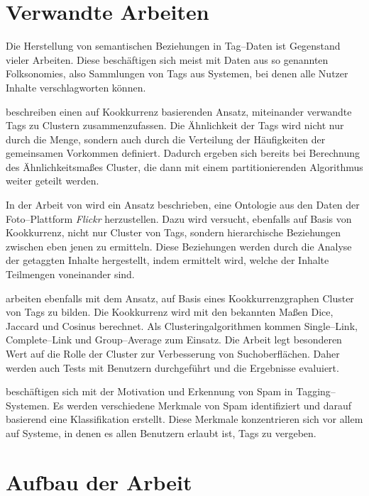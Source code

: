 \section{Verwandte Arbeiten}

Die Herstellung von semantischen Beziehungen in Tag--Daten ist Gegenstand vieler Arbeiten. Diese beschäftigen sich meist mit Daten aus so genannten Folksonomies, also Sammlungen von Tags aus Systemen, bei denen alle Nutzer Inhalte verschlagworten können.

\textcite{bks2006} beschreiben einen auf Kookkurrenz basierenden Ansatz, miteinander verwandte Tags zu Clustern zusammenzufassen. Die Ähnlichkeit der Tags wird nicht nur durch die Menge, sondern auch durch die Verteilung der Häufigkeiten der gemeinsamen Vorkommen definiert. Dadurch ergeben sich bereits bei Berechnung des Ähnlichkeitsmaßes Cluster, die dann mit einem partitionierenden Algorithmus weiter geteilt werden.

In der Arbeit von \textcite{ps2006} wird ein Ansatz beschrieben, eine Ontologie aus den Daten der Foto--Plattform \emph{Flickr} herzustellen. Dazu wird versucht, ebenfalls auf Basis von Kookkurrenz, nicht nur Cluster von Tags, sondern hierarchische Beziehungen zwischen eben jenen zu ermitteln. Diese Beziehungen werden durch die Analyse der getaggten Inhalte hergestellt, indem ermittelt wird, welche der Inhalte Teilmengen voneinander sind.

\textcite{kss2010} arbeiten ebenfalls mit dem Ansatz, auf Basis eines Kookkurrenzgraphen Cluster von Tags zu bilden. Die Kookkurrenz wird mit den bekannten Maßen Dice, Jaccard und Cosinus berechnet. Als Clusteringalgorithmen kommen Single--Link, Complete--Link und Group--Average zum Einsatz. Die Arbeit legt besonderen Wert auf die Rolle der Cluster zur Verbesserung von Suchoberflächen. Daher werden auch Tests mit Benutzern durchgeführt und die Ergebnisse evaluiert.

\textcite{mcf2009} beschäftigen sich mit der Motivation und Erkennung von Spam in Tagging--Systemen. Es werden verschiedene Merkmale von Spam identifiziert und darauf basierend eine Klassifikation erstellt. Diese Merkmale konzentrieren sich vor allem auf Systeme, in denen es allen Benutzern erlaubt ist, Tags zu vergeben.

\section{Aufbau der Arbeit}